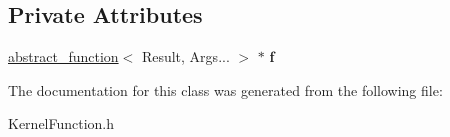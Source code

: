 \subsection*{Private Attributes}
\begin{DoxyCompactItemize}
\item 
\mbox{\label{classbicycle_1_1function_3_01_result_07_args_8_8_8_08_4_a67d4aa030a44c2bcfe5f797723e8d1c9}} 
\hyperlink{structbicycle_1_1abstract__function}{abstract\+\_\+function}$<$ Result, Args... $>$ $\ast$ {\bfseries f}
\end{DoxyCompactItemize}


The documentation for this class was generated from the following file\+:\begin{DoxyCompactItemize}
\item 
Kernel\+Function.\+h\end{DoxyCompactItemize}
